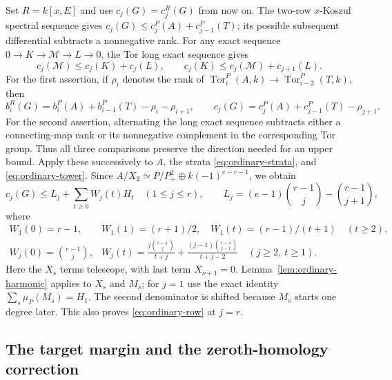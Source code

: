 Set $R=k[x,E]$ and use $c_j(G)=c_j^R(G)$ from now on. The two-row $x$-Koszul
spectral sequence gives
$c_j(G)\le c_j^P(A)+c_{j-1}^P(T)$; its possible subsequent differential
subtracts a nonnegative rank.  For any exact sequence
$0\to K\to\mathcal M\to L\to0$, the Tor long exact sequence gives
\[
 c_j(\mathcal M)\le c_j(K)+c_j(L),\qquad
 c_j(K)\le c_j(\mathcal M)+c_{j+1}(L).
\]
For the first assertion, if $\rho_i$ denotes the rank of
$\operatorname{Tor}_i^P(A,k)\to\operatorname{Tor}_{i-2}^P(T,k)$, then
\[
 b_i^R(G)=b_i^P(A)+b_{i-1}^P(T)-\rho_i-\rho_{i+1},\qquad
 c_j(G)=c_j^P(A)+c_{j-1}^P(T)-\rho_{j+1}.
\]
For the second assertion, alternating the long exact sequence subtracts
either a connecting-map rank or its nonnegative complement in the
corresponding Tor group.  Thus all three comparisons preserve the
direction needed for an upper bound.
Apply these successively to $A$, the strata
\eqref{eq:ordinary-strata}, and \eqref{eq:ordinary-tower}.
Since $A/X_2\simeq P/P_+^2\oplus k(-1)^{e-r-1}$, we obtain
\begin{equation}\label{eq:ordinary-row}
 c_j(G)\le L_j+\sum_{t\ge0}W_j(t)H_t\quad(1\le j\le r),\qquad
 L_j=(e-1)\binom{r-1}{j}-\binom{r-1}{j+1},
\end{equation}
where
\[
 \begin{array}{ll}
 W_1(0)=r-1,&W_1(1)=(r+1)/2,\quad
 W_1(t)=(r-1)/(t+1)\quad(t\ge2),\\[2pt]
 W_j(0)=\binom{r-1}{j},&
 W_j(t)=\displaystyle\frac{j\binom{r-1}{j}}{t+j}
       +\frac{(j-1)\binom{r-1}{j-1}}{t+j-2}
       \quad(j\ge2,\ t\ge1).
 \end{array}
\]
Here the $X_s$ terms telescope, with last term $X_{\nu+1}=0$.
Lemma~\ref{lem:ordinary-harmonic} applies to $X_s$ and $M_s$;
for $j=1$ use the exact identity $\sum_s\mu_P(M_s)=H_1$.
The second denominator is shifted because $M_s$ starts one degree
later.  This also proves \eqref{eq:ordinary-row} at $j=r$.

\subsection{The target margin and the zeroth-homology correction}


